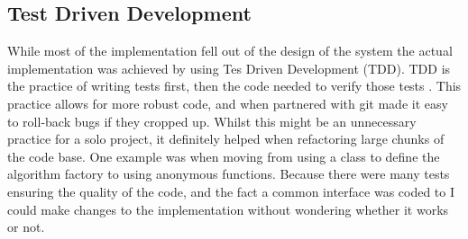 \documentclass[a4paper]{article} %
\begin{document}
\subsection*{Test Driven Development}
While most of the implementation fell out of the design of the system the actual implementation was achieved by using Tes Driven Development (TDD).
TDD is the practice of writing tests first, then the code needed to verify those tests \cite{beck_2015}.
This practice allows for more robust code, and when partnered with git made it easy to roll-back bugs if they cropped up. 
Whilst this might be an unnecessary practice for a solo project, it definitely helped when refactoring large chunks of the code base.
One example was when moving from using a class to define the algorithm factory to using anonymous functions. 
Because there were many tests ensuring the quality of the code, and the fact a common interface was coded to I could make changes to the implementation without wondering whether it works or not.
\end{document}
